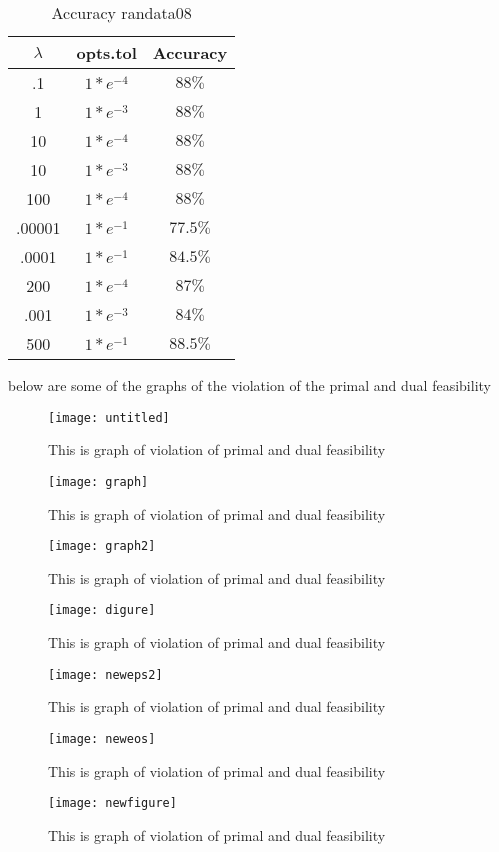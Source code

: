 \documentclass[11pt]{article}
\begin{document}
\begin{table}[ht]
\caption{Accuracy randata08}
\centering 
\begin{tabular}{c c c} 
\hline\hline 
$\lambda$ & opts.tol & Accuracy \\ [0.5ex]
\hline
.1 & $1*e^{-4}$ & $88\%$ \\
1 & $1*e^{-3}$ & $88\%$ \\
10 & $1*e^{-4}$ & $88\%$ \\
10 & $1*e^{-3}$ & $88\%$ \\
100 & $1*e^{-4}$ & $88\%$ \\
.00001 & $1*e^{-1}$ & $77.5\%$ \\
.0001 & $1*e^{-1}$ & $84.5\%$ \\
200 & $1*e^{-4}$ & $87\%$ \\
.001 & $1*e^{-3}$ & $84\%$ \\
500 & $1*e^{-1}$ & $88.5\%$ \\
\hline 
\end{tabular}
\end{table}
\bigskip
below are some of the graphs of the violation of the
primal and dual feasibility
\begin{figure}
    \centering
    \texttt{[image: untitled]}
    \caption{This is graph of violation of primal and dual feasibility}
\end{figure}
\begin{figure}
    \centering
    \texttt{[image: graph]}
    \caption{This is graph of violation of primal and dual feasibility}
\end{figure}
\begin{figure}
    \centering
    \texttt{[image: graph2]}
    \caption{This is graph of violation of primal and dual feasibility}
\end{figure}
\begin{figure}
    \centering
    \texttt{[image: digure]}
    \caption{This is graph of violation of primal and dual feasibility}
\end{figure}
\begin{figure}
    \centering
    \texttt{[image: neweps2]}
    \caption{This is graph of violation of primal and dual feasibility}
\end{figure}
\begin{figure}
    \centering
    \texttt{[image: neweos]}
    \caption{This is graph of violation of primal and dual feasibility}
\end{figure}
\begin{figure}
    \centering
    \texttt{[image: newfigure]}
    \caption{This is graph of violation of primal and dual feasibility}
\end{figure}
\end{document}

